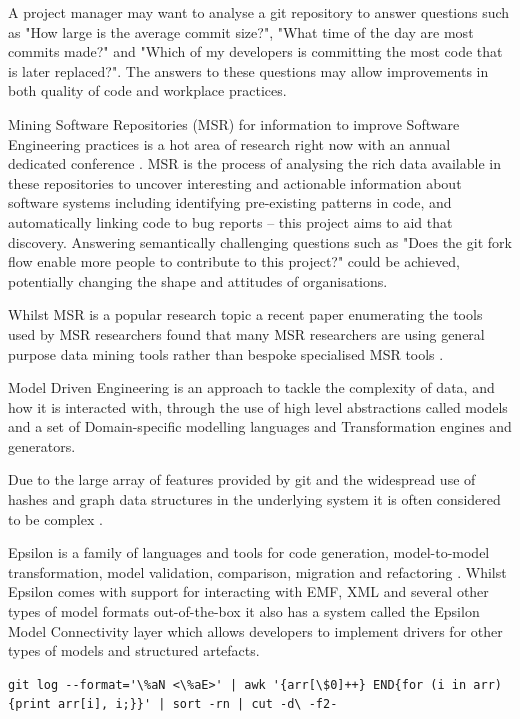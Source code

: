 \documentclass[runningheads,a4paper]{llncs}
\begin{document}
A project manager may want to analyse a git repository to answer questions such as "How large is the average commit size?", "What time of the day are most commits made?" and "Which of my developers is committing the most code that is later replaced?". The answers to these questions may allow improvements in both quality of code and workplace practices.

Mining Software Repositories (MSR) for information to improve Software Engineering practices is a hot area of research right now with an annual dedicated conference \cite{msr2015}. MSR is the process of analysing the rich data available in these repositories to uncover interesting and actionable information about software systems \cite{theroadagainformsr} including identifying pre-existing patterns in code, and automatically linking code to bug reports -- this project aims to aid that discovery. Answering semantically challenging questions such as "Does the git fork flow enable more people to contribute to this project?" could be achieved, potentially changing the shape and attitudes of organisations.

Whilst MSR is a popular research topic a recent paper enumerating the tools used by MSR researchers found that many MSR researchers are using general purpose data mining tools rather than bespoke specialised MSR tools \cite{toolsinminingsoftwarerepositories}.

Model Driven Engineering is an approach to tackle the complexity of data, and how it is interacted with, through the use of high level abstractions called models \cite{modeldrivenengineering} and a set of Domain-specific modelling languages and Transformation engines and generators.   
	
Due to the large array of features provided by git and the widespread use of hashes and graph data structures in the underlying system it is often considered to be complex \cite{gitcomplex}\cite{githard}\cite{gitmixedmetaphors}.

Epsilon is a family of languages and tools for code generation, model-to-model transformation, model validation, comparison, migration and refactoring \cite{epsilonhomepage}. Whilst Epsilon comes with support for interacting with EMF, XML and several other types of model formats out-of-the-box it also has a system called the Epsilon Model Connectivity layer which allows developers to implement drivers for other types of models and structured artefacts.

\begin{lstlisting}[caption=List Authors by Number of Commits in Git Bash, label=lst:gitbash]
git log --format='\%aN <\%aE>' | awk '{arr[\$0]++} END{for (i in arr){print arr[i], i;}}' | sort -rn | cut -d\ -f2-
\end{lstlisting}
\end{document}
